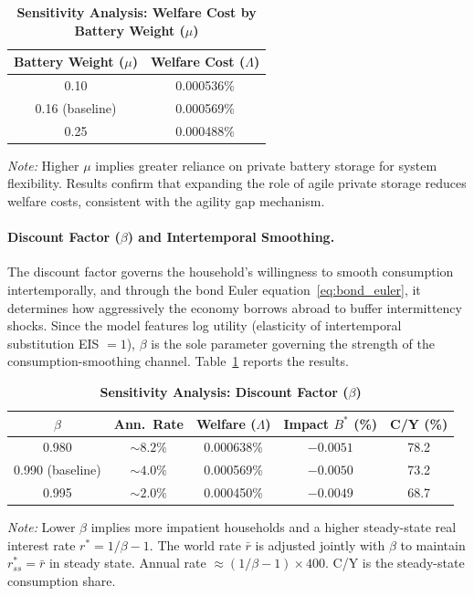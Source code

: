 \documentclass[12pt, a4paper]{article}
\begin{document}
\begin{table}[H]
    \centering
    \caption{\textbf{Sensitivity Analysis: Welfare Cost by Battery Weight ($\mu$)}}
    \renewcommand{\arraystretch}{1.3}
    \begin{tabular}{c c}
        \toprule
        \textbf{Battery Weight ($\mu$)} & \textbf{Welfare Cost ($\Lambda$)} \\
        \midrule
        0.10 & 0.000536\% \\
        0.16 (baseline) & 0.000569\% \\
        0.25 & 0.000488\% \\
        \bottomrule
    \end{tabular}
    \vspace{0.2cm}
    \parbox{\textwidth}{\footnotesize \textit{Note:} Higher $\mu$ implies greater reliance on private battery storage for system flexibility. Results confirm that expanding the role of agile private storage reduces welfare costs, consistent with the agility gap mechanism.}
\end{table}

\paragraph{Discount Factor ($\beta$) and Intertemporal Smoothing.} The discount factor governs the household's willingness to smooth consumption intertemporally, and through the bond Euler equation~\eqref{eq:bond_euler}, it determines how aggressively the economy borrows abroad to buffer intermittency shocks. Since the model features log utility (elasticity of intertemporal substitution EIS $= 1$), $\beta$ is the sole parameter governing the strength of the consumption-smoothing channel. Table~\ref{tab:beta_sensitivity} reports the results.

\begin{table}[H]
    \centering
    \caption{\textbf{Sensitivity Analysis: Discount Factor ($\beta$)}}
    \label{tab:beta_sensitivity}
    \renewcommand{\arraystretch}{1.3}
    \small
    \begin{tabular}{c c c c c}
        \toprule
        $\beta$ & \textbf{Ann.\ Rate} & \textbf{Welfare ($\Lambda$)} & \textbf{Impact $B^*$ (\%)} & \textbf{C/Y (\%)} \\
        \midrule
        0.980 & $\sim 8.2\%$ & 0.000638\% & $-0.0051$ & 78.2 \\
        0.990 (baseline) & $\sim 4.0\%$ & 0.000569\% & $-0.0050$ & 73.2 \\
        0.995 & $\sim 2.0\%$ & 0.000450\% & $-0.0049$ & 68.7 \\
        \bottomrule
    \end{tabular}
    \vspace{0.2cm}
    \parbox{\textwidth}{\footnotesize \textit{Note:} Lower $\beta$ implies more impatient households and a higher steady-state real interest rate $r^* = 1/\beta - 1$. The world rate $\bar{r}$ is adjusted jointly with $\beta$ to maintain $r^*_{ss} = \bar{r}$ in steady state. Annual rate $\approx (1/\beta - 1) \times 400$. C/Y is the steady-state consumption share.}
\end{table}
\end{document}
